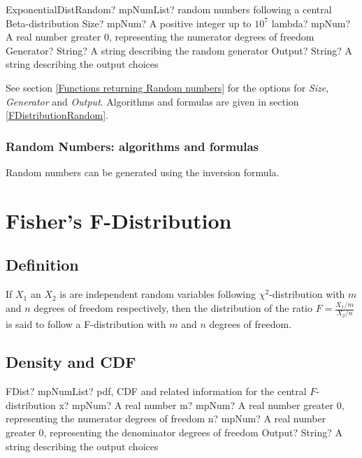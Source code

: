 \begin{mpFunctionsExtract}
	\mpFunctionFourNotImplemented
	{ExponentialDistRandom? mpNumList? random numbers following a central Beta-distribution}
	{Size? mpNum? A positive integer up to $10^7$}
	{lambda? mpNum? A real number greater 0, representing the numerator  degrees of freedom}
	{Generator? String? A string describing the random generator}
	{Output? String? A string describing the output choices}
\end{mpFunctionsExtract}

\vspace{0.3cm}

See section \ref{Functions returning Random numbers} for the options for  {\itshape\sffamily Size},  {\itshape\sffamily Generator} and {\itshape\sffamily Output}. Algorithms and formulas are given in section \ref{FDistributionRandom}.


\subsubsection{Random Numbers: algorithms and formulas}
Random numbers can be generated using the inversion formula.



\newpage
\section{Fisher's F-Distribution}
\label{FDistribution}

\subsection{Definition}
\label{FDistributionDefinition}

If $X_1$ an $X_2$ is are independent random variables  following  $\chi^2$-distribution with $m$ and $n$ degrees of freedom respectively, 
then the distribution of the ratio $F=\frac{X_1/m}{X_2/n}$ is said to follow a F-distribution with  $m$ and $n$  degrees of freedom.


\subsection{Density and CDF}

\begin{mpFunctionsExtract}
	\mpFunctionFourNotImplemented
	{FDist? mpNumList? pdf, CDF and related information for the central $F$-distribution}
	{x? mpNum? A real number}
	{m? mpNum? A real number greater 0, representing the numerator  degrees of freedom}
	{n? mpNum? A real number greater 0, representing the denominator degrees of freedom}
	{Output? String? A string describing the output choices}
\end{mpFunctionsExtract}


